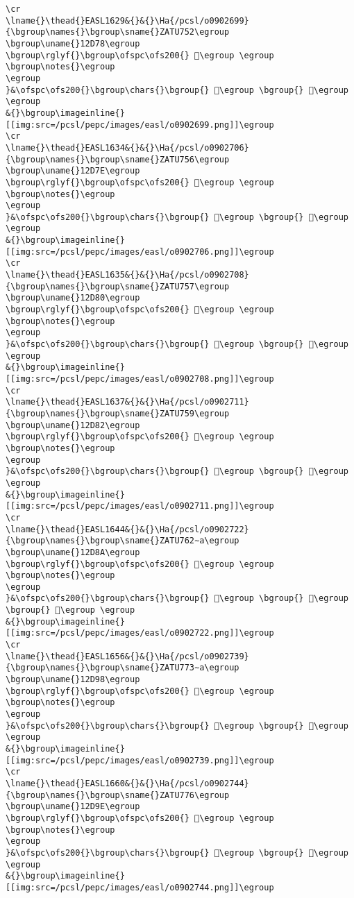 \begin{verbatim}
\cr
\lname{}\thead{}EASL1629&{}&{}\Ha{/pcsl/o0902699}{\bgroup\names{}\bgroup\sname{}ZATU752\egroup
\bgroup\uname{}12D78\egroup
\bgroup\rglyf{}\bgroup\ofspc\ofs200{} 𒵸\egroup \egroup
\bgroup\notes{}\egroup
\egroup
}&\ofspc\ofs200{}\bgroup\chars{}\bgroup{} 𒵷\egroup \bgroup{} 𒵸\egroup \egroup
&{}\bgroup\imageinline{}[[img:src=/pcsl/pepc/images/easl/o0902699.png]]\egroup
\cr
\lname{}\thead{}EASL1634&{}&{}\Ha{/pcsl/o0902706}{\bgroup\names{}\bgroup\sname{}ZATU756\egroup
\bgroup\uname{}12D7E\egroup
\bgroup\rglyf{}\bgroup\ofspc\ofs200{} 𒵾\egroup \egroup
\bgroup\notes{}\egroup
\egroup
}&\ofspc\ofs200{}\bgroup\chars{}\bgroup{} 𒵽\egroup \bgroup{} 𒵾\egroup \egroup
&{}\bgroup\imageinline{}[[img:src=/pcsl/pepc/images/easl/o0902706.png]]\egroup
\cr
\lname{}\thead{}EASL1635&{}&{}\Ha{/pcsl/o0902708}{\bgroup\names{}\bgroup\sname{}ZATU757\egroup
\bgroup\uname{}12D80\egroup
\bgroup\rglyf{}\bgroup\ofspc\ofs200{} 𒶀\egroup \egroup
\bgroup\notes{}\egroup
\egroup
}&\ofspc\ofs200{}\bgroup\chars{}\bgroup{} 𒵿\egroup \bgroup{} 𒶀\egroup \egroup
&{}\bgroup\imageinline{}[[img:src=/pcsl/pepc/images/easl/o0902708.png]]\egroup
\cr
\lname{}\thead{}EASL1637&{}&{}\Ha{/pcsl/o0902711}{\bgroup\names{}\bgroup\sname{}ZATU759\egroup
\bgroup\uname{}12D82\egroup
\bgroup\rglyf{}\bgroup\ofspc\ofs200{} 𒶂\egroup \egroup
\bgroup\notes{}\egroup
\egroup
}&\ofspc\ofs200{}\bgroup\chars{}\bgroup{} 𒶈\egroup \bgroup{} 𒶂\egroup \egroup
&{}\bgroup\imageinline{}[[img:src=/pcsl/pepc/images/easl/o0902711.png]]\egroup
\cr
\lname{}\thead{}EASL1644&{}&{}\Ha{/pcsl/o0902722}{\bgroup\names{}\bgroup\sname{}ZATU762∼a\egroup
\bgroup\uname{}12D8A\egroup
\bgroup\rglyf{}\bgroup\ofspc\ofs200{} 𒶊\egroup \egroup
\bgroup\notes{}\egroup
\egroup
}&\ofspc\ofs200{}\bgroup\chars{}\bgroup{} 𒶍\egroup \bgroup{} 𒶌\egroup \bgroup{} 𒶊\egroup \egroup
&{}\bgroup\imageinline{}[[img:src=/pcsl/pepc/images/easl/o0902722.png]]\egroup
\cr
\lname{}\thead{}EASL1656&{}&{}\Ha{/pcsl/o0902739}{\bgroup\names{}\bgroup\sname{}ZATU773∼a\egroup
\bgroup\uname{}12D98\egroup
\bgroup\rglyf{}\bgroup\ofspc\ofs200{} 𒶘\egroup \egroup
\bgroup\notes{}\egroup
\egroup
}&\ofspc\ofs200{}\bgroup\chars{}\bgroup{} 𒶘\egroup \bgroup{} 𒶙\egroup \egroup
&{}\bgroup\imageinline{}[[img:src=/pcsl/pepc/images/easl/o0902739.png]]\egroup
\cr
\lname{}\thead{}EASL1660&{}&{}\Ha{/pcsl/o0902744}{\bgroup\names{}\bgroup\sname{}ZATU776\egroup
\bgroup\uname{}12D9E\egroup
\bgroup\rglyf{}\bgroup\ofspc\ofs200{} 𒶞\egroup \egroup
\bgroup\notes{}\egroup
\egroup
}&\ofspc\ofs200{}\bgroup\chars{}\bgroup{} 𒶞\egroup \bgroup{} 𒶝\egroup \egroup
&{}\bgroup\imageinline{}[[img:src=/pcsl/pepc/images/easl/o0902744.png]]\egroup

\end{verbatim}
